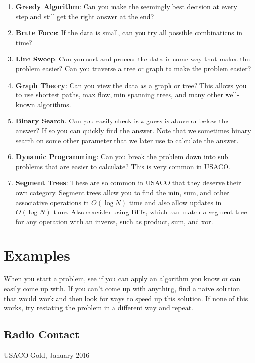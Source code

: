 \documentclass[11pt]{article}
\begin{document}
\begin{enumerate}
    \item \textbf{Greedy Algorithm}: Can you make the seemingly best decision at every step and still get the right answer at the end?
    \item \textbf{Brute Force}: If the data is small, can you try all possible combinations in time?  
    \item \textbf{Line Sweep}: Can you sort and process the data in some way that makes the problem easier?  Can you traverse a tree or graph to make the problem easier?
    \item \textbf{Graph Theory}: Can you view the data as a graph or tree?  This allows you to use shortest paths, max flow, min spanning trees, and many other well-known algorithms.
    \item \textbf{Binary Search}: Can you easily check is a guess is above or below the answer?  If so you can quickly find the answer.  Note that we sometimes binary search on some other parameter that we later use to calculate the answer.
    \item \textbf{Dynamic Programming}: Can you break the problem down into sub problems that are easier to calculate?  This is very common in USACO.
    \item \textbf{Segment Trees}:  These are so common in USACO that they deserve their own category.  Segment trees allow you to find the min, sum, and other associative operations in $O(\log N)$ time and also allow updates in $O(\log N)$ time.  Also consider using BITs, which can match a segment tree for any operation with an inverse, such as product, sum, and xor.
\end{enumerate}



\section{Examples}

When you start a problem, see if you can apply an algorithm you know or can easily come up with.  If you can't come up with anything, find a naive solution that would work and then look for ways to speed up this solution.  If none of this works, try restating the problem in a different way and repeat.

\subsection{Radio Contact}
USACO Gold, January 2016
\end{document}
